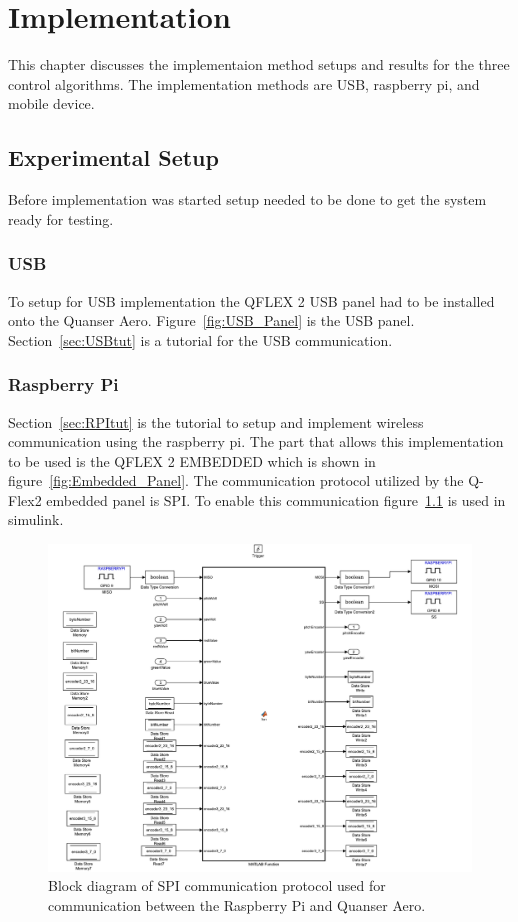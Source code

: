 \chapter{Implementation}
\label{ch: Chapter5}
This chapter discusses the implementaion method setups and results for the three control algorithms.  The implementation methods are USB, raspberry pi, and mobile device.
\section{Experimental Setup}
Before implementation was started setup needed to be done to get the system ready for testing.
\subsection{USB}
To setup for USB implementation the QFLEX 2 USB panel had to be installed onto the Quanser Aero.  Figure~\ref{fig:USB_Panel} is the USB panel.  Section~\ref{sec:USBtut} is a tutorial for the USB communication.
\subsection{Raspberry Pi}
Section~\ref{sec:RPItut} is the tutorial to setup and implement wireless communication using the raspberry pi.  The part that allows this implementation to be used is the QFLEX 2 EMBEDDED which is shown in figure~\ref{fig:Embedded_Panel}.  The communication protocol utilized by the Q-Flex2 embedded panel is SPI.  To enable this communication figure~\ref{fig:SPI_COM} is used in simulink.
\begin{figure}[!htbp]
    \centering
    \includegraphics[width=.46\textwidth,keepaspectratio=true]{figs/img/SPI_COM.pdf}
    \caption{Block diagram of SPI communication protocol used for communication between the Raspberry Pi and Quanser Aero.}
    \label{fig:SPI_COM}
\end{figure}
